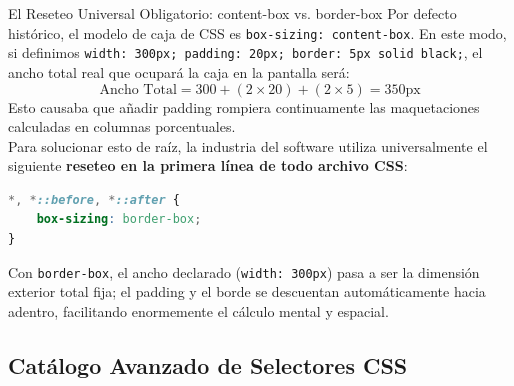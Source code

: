 \begin{importante}{El Reseteo Universal Obligatorio: content-box vs. border-box}
Por defecto histórico, el modelo de caja de CSS es \texttt{box-sizing: content-box}. En este modo, si definimos \texttt{width: 300px; padding: 20px; border: 5px solid black;}, el ancho total real que ocupará la caja en la pantalla será:
\[
\text{Ancho Total} = 300 + (2 \times 20) + (2 \times 5) = 350\text{px}
\]
Esto causaba que añadir padding rompiera continuamente las maquetaciones calculadas en columnas porcentuales.\\
Para solucionar esto de raíz, la industria del software utiliza universalmente el siguiente \textbf{reseteo en la primera línea de todo archivo CSS}:
\begin{lstlisting}[language=css]
*, *::before, *::after {
    box-sizing: border-box;
}
\end{lstlisting}
Con \texttt{border-box}, el ancho declarado (\texttt{width: 300px}) pasa a ser la dimensión exterior total fija; el padding y el borde se descuentan automáticamente hacia adentro, facilitando enormemente el cálculo mental y espacial.
\end{importante}

\subsection{Catálogo Avanzado de Selectores CSS}

